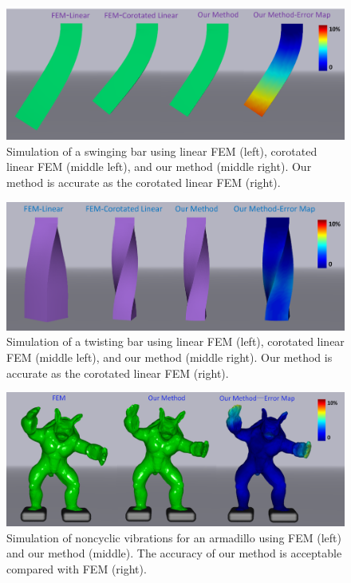 \begin{figure}[t]
  \centering
  \includegraphics[width=\linewidth]{../figs/revision/demo_bar_oscillate_vs_fem_2.png}
  \caption{\label{fig:10}
  Simulation of a swinging bar using linear FEM (left), corotated linear FEM (middle left), and our method (middle right). Our method is accurate as the corotated linear FEM (right).
}
\end{figure}
\begin{figure}[t]
  \centering
  \includegraphics[width=\linewidth]{../figs/revision/demo_bar_twist_vs_fem.png}
  \caption{\label{fig:11}
  Simulation of a twisting bar using linear FEM (left), corotated linear FEM (middle left), and our method (middle right). Our method is accurate as the corotated linear FEM (right).
}
\end{figure}
\begin{figure}[t]
  \centering
  \includegraphics[width=\linewidth]{../figs/revision/demo_armadillo_vs_fem_2.png}
  \caption{\label{fig:12}
  Simulation of noncyclic vibrations for an armadillo using FEM (left) and our method (middle). The accuracy of our method is acceptable compared with FEM (right).
}
\end{figure}


